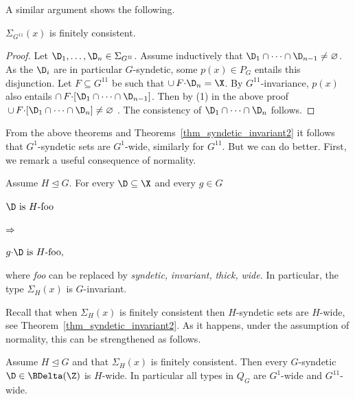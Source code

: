 A similar argument shows the following.

\begin{theorem}\label{thm_gammaP}
   $\Sigma_{G^{1\!1}}(x)$ is finitely consistent.
\end{theorem}

\begin{proof}
  \def\medrel#1{\parbox[t]{5ex}{$\displaystyle\hfil #1$}}
  \def\ceq#1#2#3{\parbox[t]{23ex}{$\displaystyle #1$}\medrel{#2}{$\displaystyle #3$}}   
  Let $\D_1,\dots,\D_n\in\Sigma_{G^{1\!1}}$.
  Assume inductively that $\D_1\cap\dots\cap\D_{n-1}\neq\varnothing$.
  As the $\D_i$ are in particular $G$-syndetic, some $p(x)\in P_G$ entails this disjunction.
  Let $F\subseteq G^{1\!1}$ be such that $\cup\,F{\cdot}\D_n=\X$.
  By $G^{1\!1}$-invariance, $p(x)$ also entails $\cap\, F{\cdot}[\D_1\cap\dots\cap\D_{n-1}]$.
  Then by (1) in the above proof $\,\cup\,F{\cdot}[\D_1\cap\dots\cap\D_n]\neq\varnothing$ .
  The consistency of $\D_1\cap\dots\cap\D_n$ follows.
\end{proof}


From the above theorems and Theorems~\ref{thm_syndetic_invariant2} it follows that $G^1$-syndetic sets are $G^1$-wide, similarly for $G^{1\!1}$.
But we can do better.
First, we remark a useful consequence of normality.

\begin{remark}\label{rem_invariance_normalsubg}
\def\medrel#1{\parbox[t]{5ex}{$\displaystyle\hfil #1$}}
\def\ceq#1#2#3{\parbox[t]{20ex}{$\displaystyle #1$}\medrel{#2}{$\displaystyle #3$}}
  Assume $H\trianglelefteq G$.
  For every $\D\subseteq\X$ and every $g\in G$ \smallskip
  
  \ceq{\hfill\D\textrm{ is }H\textrm{-foo}}{\Rightarrow}{g{\cdot}\D\textrm{ is }H\textrm{-foo},} \smallskip
  
  where \textit{foo\/} can be replaced by \textit{syndetic,} \textit{invariant,} \textit{thick,} \textit{wide.}
  In particular, the type $\Sigma_H(x)$ is $G$-invariant.
\end{remark}

Recall that when $\Sigma_H(x)$ is finitely consistent then $H$-syndetic sets are $H$-wide, see Theorem~\ref{thm_syndetic_invariant2}.
As it happens, under the assumption of normality, this can be strengthened as follows.

\begin{proposition}\label{prop_Gsyndetic_Hthick1}
  Assume $H\trianglelefteq G$ and that $\Sigma_H(x)$ is finitely consistent.
  Then every $G$-syn\-detic $\D\in\BDelta(\Z)$ is $H$-wide.
  In particular all types in $Q_G$ are $G^1$-wide and $G^{1\!1}$-wide.
\end{proposition}

